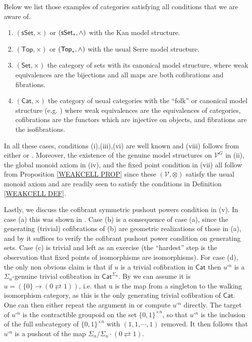 \documentclass[a4paper,10pt
,draft
]{article}%
\numberwithin{equation}{section}
\numberwithin{figure}{section}
\theoremstyle{definition} %
\newcommand{\Cat}{\mathsf{Cat}}
\newcommand{\V}{\ensuremath{\mathcal V}}
\newcommand{\1}{\ensuremath{\mathbbm 1}}%
\begin{document}
Below we list those examples of categories satisfying all conditions that we are aware of.
\begin{enumerate}[label = (\alph*)]
\item $(\mathsf{sSet},\times)$ or $(\mathsf{sSet}_{\**},\wedge)$
with the Kan model structure.
\item $(\mathsf{Top},\times)$ or $(\mathsf{Top}_{\**},\wedge)$
with the usual Serre model structure.
\item $(\mathsf{Set},\times)$ the category of sets with its canonical model structure,
where weak equivalences are the bijections and all maps are both cofibrations and fibrations.
\item $(\Cat,\times)$ the category of usual categories
with the ``folk'' or canonical model structure (e.g. \cite{Rez})
where weak equivalences are the equivalences of categories,
cofibrations are the functors which are injective on objects,
and fibrations are the isofibrations.
\end{enumerate}
In all these cases, conditions (i),(iii),(vi) are well known and
(viii) follows from either 
\cite[Lemma 1.12]{BM13} or \cite[Lemma 2.1]{BM13}.
Moreover,
the existence of the genuine model structures on $\V^G$ in (ii),
the global monoid axiom in (iv),
and the fixed point condition in (vii)
all follow from Proposition \ref{WEAKCELL PROP}
since these $(\V,\otimes)$ satisfy the usual monoid axiom and
are readily seen to satisfy the conditions in Definition \ref{WEAKCELL DEF}.


Lastly, we discuss the cofibrant symmetric pushout powers condition in (v).
In case (a) this was shown in 
\cite[Ex. 6.19]{BP_geo}.
Case (b) is a consequence of case (a), 
since the generating (trivial) cofibrations of (b) are geometric realizations of those in (a),
and by \cite[Rmk. 6.17]{BP_geo}
it suffices to verify the cofibrant pushout power condition
on generating sets.
Case (c) is trivial and left as an exercise 
(the ``hardest'' step is the observation that fixed points of isomorphisms are isomorphisms).
For case (d), the only non obvious claim is that
if $u$ is a trivial cofibration in $\mathsf{Cat}$
then $u^{\square n}$
is a $\Sigma_n$-genuine trivial cofibration in $\mathsf{Cat}^{\Sigma_n}$.
By \cite[Rmk. 6.17]{BP_geo}
we can assume it is $u = \left(\{0\} \to (0\rightleftarrows 1)\right)$,
i.e. that u is the map from a singleton to the walking isomorphism category,
as this is the only generating trivial cofibration of 
$\mathsf{Cat}$.
One can then either repeat the argument in \cite[Ex. 6.19]{BP_geo}
or compute $u^{\square n}$ directly.
The target of $u^{\square n}$
is the contractible groupoid on the set $\{0,1\}^{\times n}$,
so that $u^{\square n}$
is the inclusion of the full subcategory of 
$\{0,1\}^{\times n}$
with $(1,1,\cdots,1)$ removed.
It then follows that $u^{\square n}$
is a pushout of the map
$\Sigma_n/\Sigma_n \cdot (0 \rightleftarrows 1)$.
\end{document}
